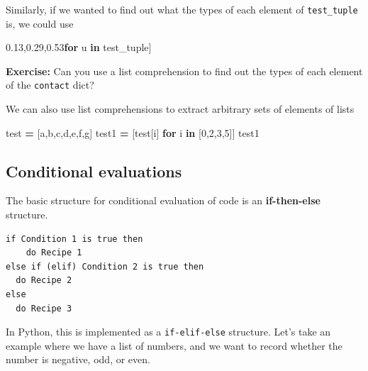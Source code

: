 \documentclass[
  letterpaper,
]{scrbook}
\newenvironment{Shaded}{\begin{snugshade}}{\end{snugshade}}
\newcommand{\BuiltInTok}[1]{#1}
\newcommand{\ControlFlowTok}[1]{\textcolor[rgb]{0.13,0.29,0.53}{\textbf{#1}}}
\newcommand{\DecValTok}[1]{\textcolor[rgb]{0.00,0.00,0.81}{#1}}
\newcommand{\KeywordTok}[1]{\textcolor[rgb]{0.13,0.29,0.53}{\textbf{#1}}}
\newcommand{\NormalTok}[1]{#1}
\newcommand{\OperatorTok}[1]{\textcolor[rgb]{0.81,0.36,0.00}{\textbf{#1}}}
\newcommand{\StringTok}[1]{\textcolor[rgb]{0.31,0.60,0.02}{#1}}
\begin{document}
Similarly, if we wanted to find out what the types of each element of \texttt{test\_tuple} is, we could use

\begin{Shaded}
\begin{Highlighting}[]
\NormalTok{[}\BuiltInTok{type}\NormalTok{(u) }\ControlFlowTok{for}\NormalTok{ u }\KeywordTok{in}\NormalTok{ test\_tuple]}
\end{Highlighting}
\end{Shaded}

\textbf{Exercise:} Can you use a list comprehension to find out the types of each element of the \texttt{contact} dict?

We can also use list comprehensions to extract arbitrary sets of elements of lists

\begin{Shaded}
\begin{Highlighting}[]
\NormalTok{test }\OperatorTok{=}\NormalTok{ [}\StringTok{\textquotesingle{}a\textquotesingle{}}\NormalTok{,}\StringTok{\textquotesingle{}b\textquotesingle{}}\NormalTok{,}\StringTok{\textquotesingle{}c\textquotesingle{}}\NormalTok{,}\StringTok{\textquotesingle{}d\textquotesingle{}}\NormalTok{,}\StringTok{\textquotesingle{}e\textquotesingle{}}\NormalTok{,}\StringTok{\textquotesingle{}f\textquotesingle{}}\NormalTok{,}\StringTok{\textquotesingle{}g\textquotesingle{}}\NormalTok{]}
\NormalTok{test1 }\OperatorTok{=}\NormalTok{ [test[i] }\ControlFlowTok{for}\NormalTok{ i }\KeywordTok{in}\NormalTok{ [}\DecValTok{0}\NormalTok{,}\DecValTok{2}\NormalTok{,}\DecValTok{3}\NormalTok{,}\DecValTok{5}\NormalTok{]]}
\NormalTok{test1}
\end{Highlighting}
\end{Shaded}

\hypertarget{conditional-evaluations}{%
\subsection{Conditional evaluations}\label{conditional-evaluations}}

The basic structure for conditional evaluation of code is an \textbf{if-then-else} structure.

\begin{verbatim}
if Condition 1 is true then
    do Recipe 1
else if (elif) Condition 2 is true then
  do Recipe 2
else
  do Recipe 3
\end{verbatim}

In Python, this is implemented as a \texttt{if-elif-else} structure. Let's take an example where we have a list of numbers, and we want to record whether the number is negative, odd, or even.
\end{document}

